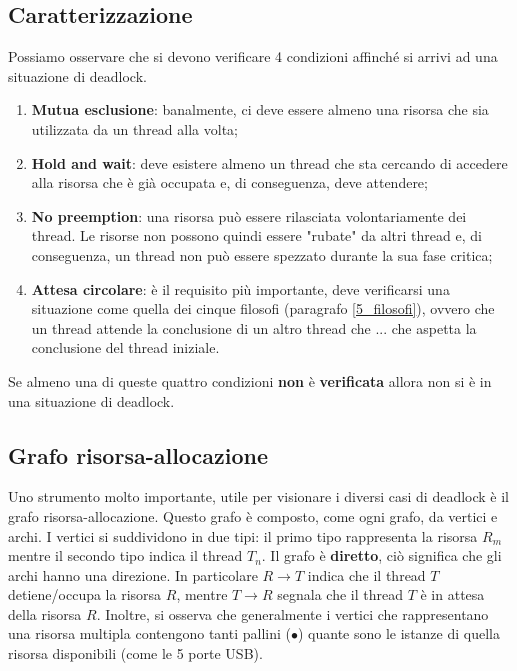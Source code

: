 \subsection{Caratterizzazione}\label{4_punti_deadlock}
Possiamo osservare che si devono verificare 4 condizioni affinché si arrivi ad una situazione di deadlock.
\vspace{-5px}
\begin{enumerate}
    \setlength{\itemsep}{-.15 em}
    \item \textbf{Mutua esclusione}: banalmente, ci deve essere almeno una risorsa che sia utilizzata da un thread alla volta;
    \item \textbf{Hold and wait}: deve esistere almeno un thread che sta cercando di accedere alla risorsa che è già occupata e, di conseguenza, deve attendere;
    \item \textbf{No preemption}: una risorsa può essere rilasciata volontariamente dei thread. Le risorse non possono quindi essere "rubate" da altri thread e, di conseguenza, un thread non può essere spezzato durante la sua fase critica;
    \item \textbf{Attesa circolare}: è il requisito più importante, deve verificarsi una situazione come quella dei cinque filosofi (paragrafo \ref{5_filosofi}), ovvero che un thread attende la conclusione di un altro thread che ... che aspetta la conclusione del thread iniziale.
\end{enumerate}
Se almeno una di queste quattro condizioni \textbf{non} è \textbf{verificata} allora non si è in una situazione di deadlock.

% 
\subsection{Grafo risorsa-allocazione}
Uno strumento molto importante, utile per visionare i diversi casi di deadlock è il grafo risorsa-allocazione. Questo grafo è composto, come ogni grafo, da vertici e archi. I vertici si suddividono in due tipi: il primo tipo rappresenta la risorsa $R_m$ mentre il secondo tipo indica il thread $T_n$. Il grafo è \textbf{diretto}, ciò significa che gli archi hanno una direzione. In particolare $R \to T$ indica che il thread $T$ detiene/occupa la risorsa $R$, mentre $T \to R$ segnala che il thread $T$ è in attesa della risorsa $R$. Inoltre, si osserva che generalmente i vertici che rappresentano una risorsa multipla contengono tanti pallini ($\bullet$) quante sono le istanze di quella risorsa disponibili (come le 5 porte USB). 

